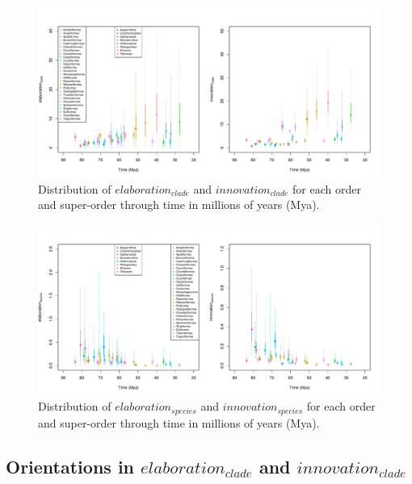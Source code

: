 \documentclass[12pt,a4paper]{article}
\begin{document}
\begin{figure}[H]
\centering
   \includegraphics[width=1\textwidth]{Figures/Elaboration_and_innovation_clade_through_time.pdf}
\caption{Distribution of $elaboration_{clade}$ and $innovation_{clade}$ for each order and super-order through time in millions of years (Mya).}
\label{Fig:figure_ei_clade_through_time}
\end{figure}


\begin{figure}[H]
\centering
   \includegraphics[width=1\textwidth]{Figures/Elaboration_and_innovation_species_through_time.pdf}
\caption{Distribution of $elaboration_{species}$ and $innovation_{species}$ for each order and super-order through time in millions of years (Mya).}
\label{Fig:figure_ei_species_through_time}
\end{figure}

\newpage

\subsection{Orientations in $elaboration_{clade}$ and $innovation_{clade}$}
\end{document}
